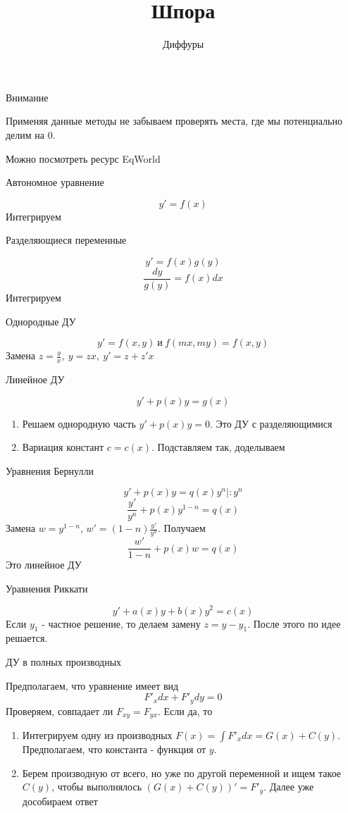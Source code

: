 \documentclass[11pt]{article}
\title{Шпора}
\author{Диффуры}
\date{}
\begin{document}
	\maketitle
	\begin{center}
		Внимание
	\end{center}

	Применяя данные методы не забываем проверять места, где мы потенциально делим на 0.
	
	Можно посмотреть ресурс EqWorld
	\begin{center}
		Автономное уравнение
	\end{center}
	$$y' = f(x)$$
	Интегрируем
	\begin{center}
		Разделяющиеся переменные
	\end{center}
	$$y' = f(x)g(y)$$
	$$\frac{dy}{g(y)} = f(x)dx$$
	Интегрируем
	\begin{center}
		Однородные ДУ
	\end{center}
	$$y' = f(x, y) \ \text{и} \ f(mx, my) = f(x, y)$$
	Замена $z = \frac{y}{x},\ y = zx,\ y' = z + z'x$
	\begin{center}
		Линейное ДУ
	\end{center}
	$$y' + p(x)y= g(x)$$
	\begin{enumerate}
		\item Решаем однородную часть $y' + p(x)y = 0$. Это ДУ с разделяющимися
		\item Вариация констант $c = c(x)$. Подставляем так, доделываем
	\end{enumerate}
	\begin{center}
		Уравнения Бернулли
	\end{center}
	$$y' +p(x) y = q(x)y^n | :y^n$$
	$$\frac{y'}{y^n} + p(x)y^{1-n} = q(x)$$
	Замена $w = y^{1-n}$, $w' = (1-n)\frac{y'}{y^n}$. Получаем
	$$\frac{w'}{1-n} + p(x)w = q(x)$$
	Это линейное ДУ
	
	\begin{center}
		Уравнения Риккати
	\end{center}
	$$y' +a(x) y + b(x)y^2 = c(x)$$
	Если $y_1$ - частное решение, то делаем замену $z = y-y_1$. После этого по идее решается.
	\begin{center}
		ДУ в полных производных
	\end{center}
	Предполагаем, что уравнение имеет вид
	$$F'_x dx + F'_y dy = 0$$
	Проверяем, совпадает ли $F_{xy} = F_{yx}$. Если да, то
	\begin{enumerate}
		\item Интегрируем одну из производных 
		$F(x) = \int F'_x dx = G(x) + C(y)$. Предполагаем, что константа - функция от $y$.
		\item Берем производную от всего, но уже по другой переменной и ищем такое $C(y)$, чтобы выполнялось $(G(x) + C(y))' = F'_y$. Далее уже дособираем ответ
	\end{enumerate}
\end{document}
